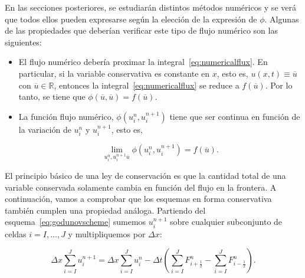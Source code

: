 En las secciones posteriores, se estudiarán distintos métodos
numéricos y se verá que todos ellos pueden expresarse según la
elección de la expresión de $\phi$.
Algunas de las propiedades que deberían verificar este tipo de flujo
numérico son las siguientes:

\begin{itemize}
  \item

        El flujo numérico debería proximar la integral~\eqref{eq:numericalflux}.
        En particular, si la variable conservativa es constante en
        $x$, esto es, $u\left(x,t\right)\equiv\overline{u}$ con
        $\overline{u}\in\mathbb{R}$, entonces la
        integral~\eqref{eq:numericalflux} se reduce a
        $f\left(\overline{u}\right)$.
        Por lo tanto, se tiene que
        \begin{math}
          \phi
          \left(
          \overline{u},
          \overline{u}
          \right)=
          f\left(\overline{u}\right).
        \end{math}

  \item

        La función flujo numérico,
        \begin{math}
          \phi\left(u^{n}_{i},u^{n+1}_{i}\right)
        \end{math}
        tiene que ser continua en función de la
        variación de $u^{n}_{i}$ y $u^{n+1}_{i}$,
        esto es,

        \begin{equation*}
          \lim_{u^{n}_{i},u^{n+1}_{i}\overline{u}}
          \phi\left(u^{n}_{i},u^{n+1}_{i}\right)=
          f\left(\overline{u}\right).
        \end{equation*}
\end{itemize}

El principio básico de una ley de conservación es que la cantidad
total de una variable conservada solamente cambia en función del
flujo en la frontera.
A continuación, vamos a comprobar que los esquemas en forma
conservativa también cumplen una propiedad análoga.
Partiendo del esquema~\eqref{eq:godunovscheme} sumemos $u^{n+1}_{i}$
sobre cualquier subconjunto de celdas $i=I,\dotsc,J$ y multipliquemos
por $\Delta x$:

\begin{equation*}
  \Delta x
  \sum_{i=I}^{J}
  u^{n+1}_{i}=
  \Delta x
  \sum_{i=I}^{J}
  u^{n}_{i}-
  \Delta t
  \left(
  \sum_{i=I}^{J}
  F^{n}_{i+\frac{1}{2}}-
  \sum_{i=I}^{J}
  F^{n}_{i-\frac{1}{2}}
  \right).
\end{equation*}


